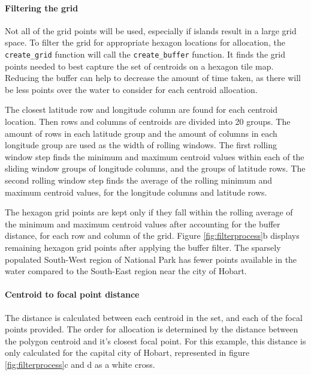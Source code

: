 \hypertarget{filtering-the-grid}{%
\paragraph{Filtering the grid}\label{filtering-the-grid}}

Not all of the grid points will be used, especially if islands result in
a large grid space. To filter the grid for appropriate hexagon locations
for allocation, the \texttt{create\_grid} function will call the
\texttt{create\_buffer} function. It finds the grid points needed to
best capture the set of centroids on a hexagon tile map. Reducing the
buffer can help to decrease the amount of time taken, as there will be
less points over the water to consider for each centroid allocation.

The closest latitude row and longitude column are found for each
centroid location. Then rows and columns of centroids are divided into
20 groups. The amount of rows in each latitude group and the amount of
columns in each longitude group are used as the width of rolling
windows. The first rolling window step finds the minimum and maximum
centroid values within each of the sliding window groups of longitude
columns, and the groups of latitude rows. The second rolling window step
finds the average of the rolling minimum and maximum centroid values,
for the longitude columns and latitude rows.

The hexagon grid points are kept only if they fall within the rolling
average of the minimum and maximum centroid values after accounting for
the buffer distance, for each row and column of the grid. Figure
\ref{fig:filterprocess}b displays remaining hexagon grid points after
applying the buffer filter. The sparsely populated South-West region of
National Park has fewer points available in the water compared to the
South-East region near the city of Hobart.

\hypertarget{centroid-to-focal-point-distance}{%
\paragraph{Centroid to focal point
distance}\label{centroid-to-focal-point-distance}}

The distance is calculated between each centroid in the set, and each of
the focal points provided. The order for allocation is determined by the
distance between the polygon centroid and it's closest focal point. For
this example, this distance is only calculated for the capital city of
Hobart, represented in figure \ref{fig:filterprocess}c and d as a white
cross.

